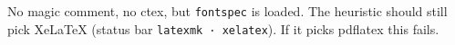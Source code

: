 \documentclass{article}
\begin{document}
No magic comment, no ctex, but \verb|fontspec| is loaded. The heuristic should
still pick XeLaTeX (status bar \texttt{latexmk · xelatex}). If it picks
pdflatex this fails.
\end{document}
